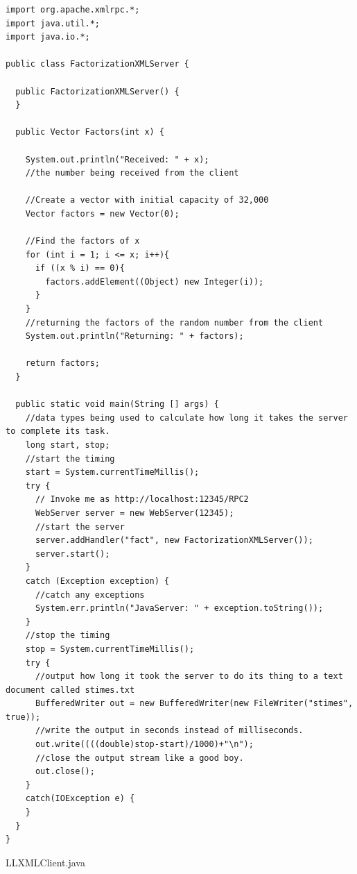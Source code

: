 \documentclass{article}
\begin{document}
\begin{lstlisting}
import org.apache.xmlrpc.*;
import java.util.*;
import java.io.*;

public class FactorizationXMLServer {

  public FactorizationXMLServer() {
  }

  public Vector Factors(int x) {

    System.out.println("Received: " + x);
    //the number being received from the client

    //Create a vector with initial capacity of 32,000
    Vector factors = new Vector(0);

    //Find the factors of x
    for (int i = 1; i <= x; i++){
      if ((x % i) == 0){
        factors.addElement((Object) new Integer(i));
      }
    }
    //returning the factors of the random number from the client
    System.out.println("Returning: " + factors);

    return factors;
  }

  public static void main(String [] args) {
    //data types being used to calculate how long it takes the server to complete its task.
    long start, stop;
    //start the timing
    start = System.currentTimeMillis();
    try {
      // Invoke me as http://localhost:12345/RPC2
      WebServer server = new WebServer(12345);
      //start the server
      server.addHandler("fact", new FactorizationXMLServer());
      server.start();
    }
    catch (Exception exception) {
      //catch any exceptions
      System.err.println("JavaServer: " + exception.toString());
    }
    //stop the timing
    stop = System.currentTimeMillis();
    try {
      //output how long it took the server to do its thing to a text document called stimes.txt
      BufferedWriter out = new BufferedWriter(new FileWriter("stimes", true));
      //write the output in seconds instead of milliseconds.
      out.write((((double)stop-start)/1000)+"\n");
      //close the output stream like a good boy.
      out.close();
    }
    catch(IOException e) {
    }
  }
}
\end{lstlisting}

LLXMLClient.java
\end{document}
